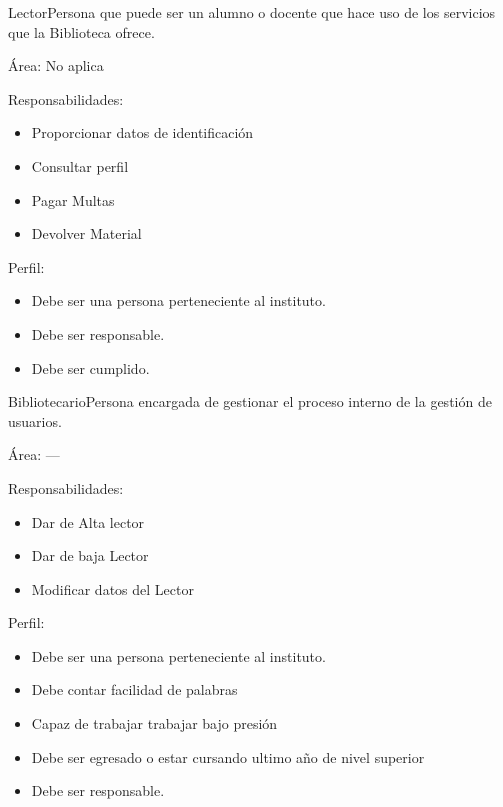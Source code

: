 \begin{Actor}{Lector}{Persona que puede ser un alumno o docente que hace uso de los servicios que la Biblioteca ofrece.}
	\item[Área:] No aplica
	\item[Responsabilidades:] \hspace{1pt}
	\begin{itemize}
		\item Proporcionar datos de identificación
		\item Consultar perfil
		\item Pagar Multas
		\item Devolver Material
	\end{itemize}
	\item[Perfil:] \hspace{1pt}
	\begin{itemize}
		\item Debe ser una persona perteneciente al instituto. 		
		\item Debe ser responsable.
		\item Debe ser cumplido.
	\end{itemize}
\end{Actor}

\begin{Actor}{Bibliotecario}{Persona encargada de gestionar el proceso interno de la gestión de usuarios. }
	\item[Área:] ---
	\item[Responsabilidades:] \hspace{1pt}
	\begin{itemize}
		\item Dar de Alta lector
		\item Dar de baja Lector
		\item Modificar datos del Lector
			\end{itemize}
\item[Perfil:] \hspace{1pt}
	\begin{itemize}
	\item Debe ser una persona perteneciente al instituto.
		\item Debe contar facilidad de palabras
		\item Capaz de trabajar trabajar bajo presión 
		\item Debe ser egresado o estar cursando ultimo año de nivel superior 		
		\item Debe ser responsable.
	\end{itemize}
\end{Actor}




